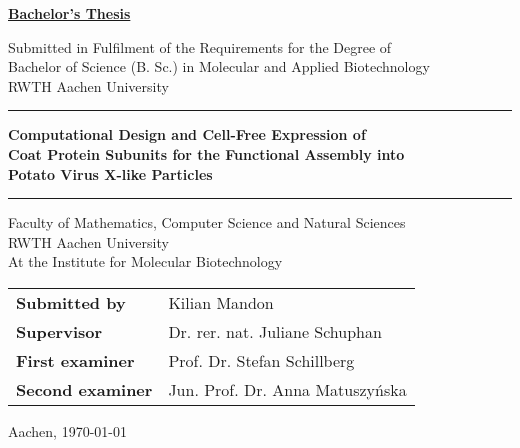 \documentclass[12pt]{article}
\begin{document}
\begin{titlepage}
    \begin{center}
         \vspace*{0.5cm}
         
         \textbf{\underline{Bachelor's Thesis}}
         
         \vspace{1.5cm}
         
         \large
         Submitted in Fulfilment of the Requirements for the Degree of\\
         Bachelor of Science (B. Sc.) in Molecular and Applied Biotechnology\\
         RWTH Aachen University
         
         \vspace{1cm}
         
         \rule{\textwidth}{0.4pt}
         
         \vspace{1cm}
         
         \textbf{\LARGE Computational Design and Cell-Free Expression of\\
         Coat Protein Subunits for the Functional Assembly into\\
         Potato Virus X-like Particles}
         
         \vspace{1cm}
         
         \rule{\textwidth}{0.4pt}
         
         \vspace{1cm}
         
         Faculty of Mathematics, Computer Science and Natural Sciences\\
         RWTH Aachen University\\
         
         At the Institute for Molecular Biotechnology
         
         \vspace{1cm}
         
         \begin{tabular}{ll}
         \textbf{Submitted by} & Kilian Mandon \\
         \textbf{Supervisor} & Dr. rer. nat. Juliane Schuphan \\
         \textbf{First examiner} & Prof. Dr. Stefan Schillberg \\
         \textbf{Second examiner} & Jun. Prof. Dr. Anna Matuszyńska \\
         \end{tabular}
         
         \vspace{1cm}
         
         Aachen, \today
         
    \end{center}
 \end{titlepage}
\end{document}
